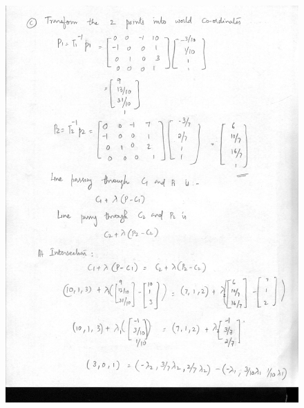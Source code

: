 \documentclass{article}
\begin{document}
\begin{figure}
\includegraphics[width=15cm]{3.jpg}
\end{figure}
\end{document}
